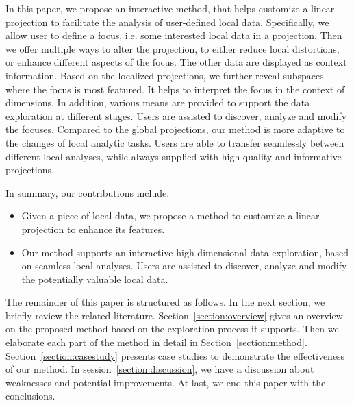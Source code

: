 In this paper, we propose an interactive method, that helps customize a linear projection to facilitate the analysis of user-defined local data. Specifically, we allow user to define a focus, i.e. some interested local data in a projection. Then we offer multiple ways to alter the projection, to either reduce local distortions, or enhance different aspects of the focus. The other data are displayed as context information. Based on the localized projections, we further reveal subspaces where the focus is most featured. It helps to interpret the focus in the context of dimensions. In addition, various means are provided to support the data exploration at different stages. Users are assisted to discover, analyze and modify the focuses. Compared to the global projections, our method is more adaptive to the changes of local analytic tasks. Users are able to transfer seamlessly between different local analyses, while always supplied with high-quality and informative projections.

In summary, our contributions include:
\begin{itemize}
\item Given a piece of local data, we propose a method to customize a linear projection to enhance its features.
\item Our method supports an interactive high-dimensional data exploration, based on seamless local analyses. Users are assisted to discover, analyze and modify the potentially valuable local data.
\end{itemize}

The remainder of this paper is structured as follows. In the next section, we briefly review the related literature. Section~\ref{section:overview} gives an overview on the proposed method based on the exploration process it supports. Then we elaborate each part of the method in detail in Section~\ref{section:method}. Section~\ref{section:casestudy} presents case studies to demonstrate the effectiveness of our method. In session~\ref{section:discussion}, we have a discussion about weaknesses and potential improvements. At last, we end this paper with the conclusions.

